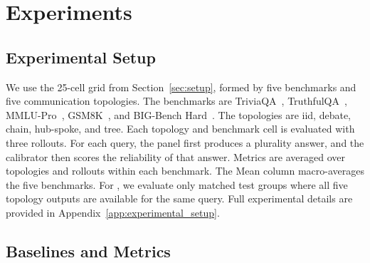 \section{Experiments}
\label{sec:experiments}



\subsection{Experimental Setup}

We use the 25-cell grid from Section~\ref{sec:setup}, formed by five benchmarks and five communication topologies. 
The benchmarks are TriviaQA~\citep{joshi2017triviaqalargescaledistantly}, TruthfulQA~\citep{lin2022truthfulqameasuringmodelsmimic}, MMLU-Pro~\citep{wang2024mmluprorobustchallengingmultitask}, GSM8K~\citep{cobbe2021trainingverifierssolvemath}, and BIG-Bench Hard~\citep{suzgun2022challengingbigbenchtaskschainofthought}. 
The topologies are iid, debate, chain, hub-spoke, and tree. 
Each topology and benchmark cell is evaluated with three rollouts. 
For each query, the panel first produces a plurality answer, and the calibrator then scores the reliability of that answer.
%
Metrics are averaged over topologies and rollouts within each benchmark. 
The Mean column macro-averages the five benchmarks. 
For \select{}, we evaluate only matched test groups where all five topology outputs are available for the same query. Full experimental details are provided in Appendix~\ref{app:experimental_setup}.

\subsection{Baselines and Metrics}
\label{sec:baselines}


